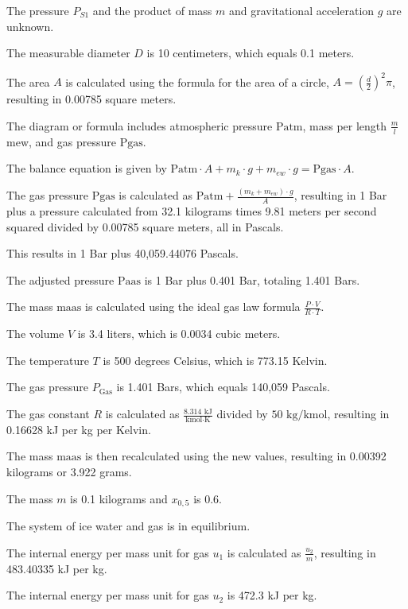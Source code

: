 The pressure \( P_{S1} \) and the product of mass \( m \) and gravitational acceleration \( g \) are unknown.

The measurable diameter \( D \) is 10 centimeters, which equals 0.1 meters.

The area \( A \) is calculated using the formula for the area of a circle, \( A = \left( \frac{d}{2} \right)^2 \pi \), resulting in 0.00785 square meters.

The diagram or formula includes atmospheric pressure \( \text{Patm} \), mass per length \( \frac{m}{l} \) \( \text{mew} \), and gas pressure \( \text{Pgas} \).

The balance equation is given by \( \text{Patm} \cdot A + m_k \cdot g + m_{ew} \cdot g = \text{Pgas} \cdot A \).

The gas pressure \( \text{Pgas} \) is calculated as \( \text{Patm} + \frac{(m_k + m_{ew}) \cdot g}{A} \), resulting in 1 Bar plus a pressure calculated from 32.1 kilograms times 9.81 meters per second squared divided by 0.00785 square meters, all in Pascals.

This results in 1 Bar plus 40,059.44076 Pascals.

The adjusted pressure \( \text{Paas} \) is 1 Bar plus 0.401 Bar, totaling 1.401 Bars.

The mass \( \text{maas} \) is calculated using the ideal gas law formula \( \frac{P \cdot V}{R \cdot T} \).

The volume \( V \) is 3.4 liters, which is 0.0034 cubic meters.

The temperature \( T \) is 500 degrees Celsius, which is 773.15 Kelvin.

The gas pressure \( P_{\text{Gas}} \) is 1.401 Bars, which equals 140,059 Pascals.

The gas constant \( R \) is calculated as \( \frac{8.314 \text{ kJ}}{\text{kmol} \cdot \text{K}} \) divided by \( 50 \text{ kg}/\text{kmol} \), resulting in 0.16628 kJ per kg per Kelvin.

The mass \( \text{maas} \) is then recalculated using the new values, resulting in 0.00392 kilograms or 3.922 grams.

The mass \( m \) is 0.1 kilograms and \( x_{0,5} \) is 0.6.

The system of ice water and gas is in equilibrium.

The internal energy per mass unit for gas \( u_1 \) is calculated as \( \frac{u_2}{m} \), resulting in 483.40335 kJ per kg.

The internal energy per mass unit for gas \( u_2 \) is 472.3 kJ per kg.

